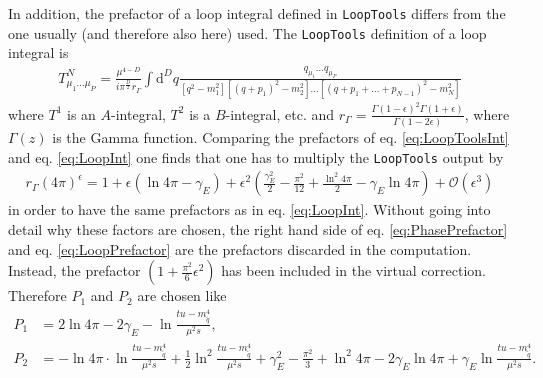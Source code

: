In addition, the prefactor of a loop integral defined in \texttt{LoopTools} differs from the one usually (and therefore also here) used. The \texttt{LoopTools} definition\cite{LoopToolsManual} of a loop integral is 
\begin{align}
T^N_{\mu_1\hdots\mu_P} = \frac{\mu^{4-D}}{i\pi^{\frac{D}{2}}r_\Gamma}\int\mathrm{d}^Dq\frac{q_{\mu_1} \hdots q_{\mu_P}}{[q^2-m_1^2] [(q+p_1)^2-m_2^2] \hdots [(q+p_1+ \hdots +p_{N-1})^2-m_N^2]}\label{eq:LoopToolsInt}
\end{align}
where $T^1$ is an $A$-integral, $T^2$ is a $B$-integral, etc. and $r_\Gamma = \frac{\Gamma(1-\epsilon)^2\Gamma(1+\epsilon)}{\Gamma(1-2\epsilon)}$, where $\Gamma(z)$ is the Gamma function. Comparing the prefactors of eq. \eqref{eq:LoopToolsInt} and eq.  \eqref{eq:LoopInt} one finds that one has to multiply the \texttt{LoopTools} output by
\begin{align}
r_\Gamma (4\pi)^\epsilon = 1 + \epsilon(\ln 4\pi -\gamma_E) + \epsilon^2\left( \frac{\gamma_E^2}{2} - \frac{\pi^2}{12} + \frac{\ln^2 4\pi}{2} - \gamma_E\ln 4\pi \right) + \mathcal{O}(\epsilon^3)\label{eq:LoopPrefactor}
\end{align}
in order to have the same prefactors as in eq. \eqref{eq:LoopInt}. Without going into detail why these factors are chosen, the right hand side of eq. \eqref{eq:PhasePrefactor} and eq. \eqref{eq:LoopPrefactor} are the prefactors discarded in the computation. Instead, the prefactor $\left( 1 + \frac{\pi^2}{6}\epsilon^2 \right)$ has been included in the virtual correction. Therefore $P_1$ and $P_2$ are chosen like
\begin{align}
P_1 &=  2\ln 4\pi - 2\gamma_E - \ln \frac{tu - m_{\tilde{q}}^4}{\mu^2 s},\\
P_2 &=  -\ln 4\pi \cdot\ln \frac{tu - m_{\tilde{q}}^4}{\mu^2 s} + \frac{1}{2} \ln^2 \frac{tu - m_{\tilde{q}}^4}{\mu^2 s}  + \gamma_E^2 - \frac{\pi^2}{3} + \ln^2 4\pi - 2\gamma_E\ln 4\pi + \gamma_E \ln \frac{tu - m_{\tilde{q}}^4}{\mu^2 s}.  \nonumber
\end{align}


